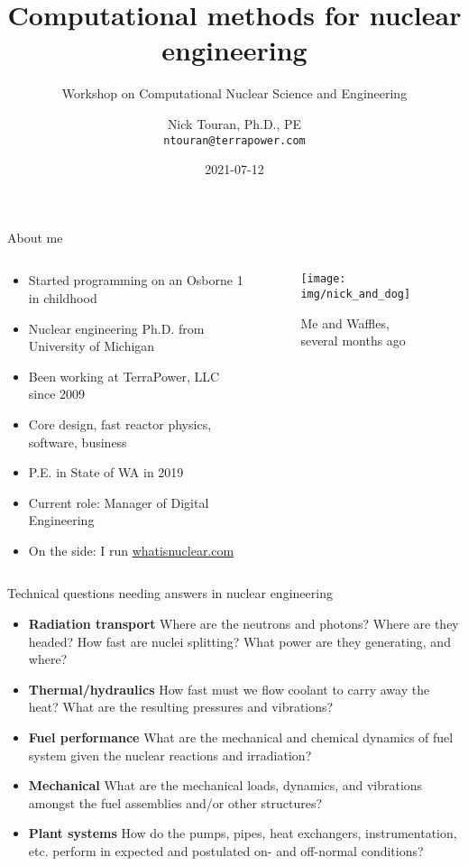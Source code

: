\documentclass[pdf,aspectratio=169]{beamer}
\title{\textbf{Computational methods for nuclear engineering}}
\subtitle{Workshop on Computational Nuclear Science and Engineering}
\date{2021-07-12}
\institute{IAEA}
\author[Touran]{Nick Touran, Ph.D., PE \\ \texttt{ntouran@terrapower.com} }
\begin{document}

\begin{frame}
\titlepage
\end{frame}

\begin{frame}{About me}
    \begin{columns}
    \begin{column}{0.6\textwidth}
    \begin{itemize}
        \item Started programming on an Osborne 1 in childhood
        \item Nuclear engineering Ph.D. from University of Michigan
        \item Been working at TerraPower, LLC since 2009 
        \item Core design, fast reactor physics, software, business
        \item P.E. in State of WA in 2019
        \item Current role: Manager of Digital Engineering
        \item On the side: I run \href{https://whatisnuclear.com}{whatisnuclear.com}
    \end{itemize}
    \end{column}
    \begin{column}{0.4\textwidth}
        \begin{figure}[ht]
        \centering
            \texttt{[image: img/nick\_and\_dog]}
            \caption{Me and Waffles, several months ago}
        \end{figure}
    \end{column}
\end{columns}
\end{frame}

\begin{frame}{Technical questions needing answers in nuclear engineering}
        \begin{itemize}
            \item \textbf{Radiation transport} Where are the neutrons and photons? Where
                are they headed? How fast are nuclei splitting? What power are they
                generating, and where?
            \item \textbf{Thermal/hydraulics} How fast must we flow coolant to carry away
                the heat? What are the resulting pressures and vibrations?
            \item \textbf{Fuel performance} What are the mechanical and chemical
                dynamics of fuel system given the nuclear reactions and irradiation?
            \item \textbf{Mechanical} What are the mechanical loads, dynamics, and
                vibrations amongst the fuel assemblies and/or other structures?
            \item \textbf{Plant systems} How do the pumps, pipes, heat exchangers,
                instrumentation, etc. perform in expected and postulated on- and off-normal
                conditions?
        \end{itemize}
\end{frame}
\end{document}
